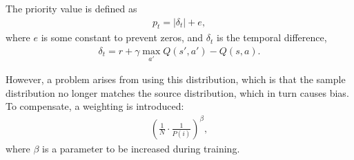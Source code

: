 The priority value is defined as
\begin{align*}
    p_t = \left|\delta_t\right| + e,
\end{align*}
where $e$ is some constant to prevent zeros, and $\delta_t$ is the temporal
difference,
\begin{align*}
    \delta_t = r + \gamma\max_{a'}Q(s',a') - Q(s,a).
\end{align*}

However, a problem arises from using this distribution, which is that the sample
distribution no longer matches the source distribution, which in turn causes
bias.
To compensate, a weighting is introduced:
\begin{align*}
    \left(\frac{1}{N}\cdot\frac{1}{P(i)}\right)^{\beta},
\end{align*}
where $\beta$ is a parameter to be increased during training.


